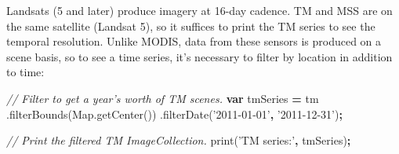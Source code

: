 \documentclass[
]{article}
\newenvironment{Shaded}{\begin{snugshade}}{\end{snugshade}}
\newcommand{\AttributeTok}[1]{\textcolor[rgb]{0.77,0.63,0.00}{#1}}
\newcommand{\CommentTok}[1]{\textcolor[rgb]{0.56,0.35,0.01}{\textit{#1}}}
\newcommand{\KeywordTok}[1]{\textcolor[rgb]{0.13,0.29,0.53}{\textbf{#1}}}
\newcommand{\NormalTok}[1]{#1}
\newcommand{\OperatorTok}[1]{\textcolor[rgb]{0.81,0.36,0.00}{\textbf{#1}}}
\newcommand{\StringTok}[1]{\textcolor[rgb]{0.31,0.60,0.02}{#1}}
\newcommand{\VariableTok}[1]{\textcolor[rgb]{0.00,0.00,0.00}{#1}}
\begin{document}
Landsats (5 and later) produce imagery at 16-day cadence. TM and MSS are on the same satellite (Landsat 5), so it suffices to print the TM series to see the temporal resolution. Unlike MODIS, data from these sensors is produced on a scene basis, so to see a time series, it's necessary to filter by location in addition to time:

\begin{Shaded}
\begin{Highlighting}[]

   \CommentTok{// Filter to get a year's worth of TM scenes.}
  \KeywordTok{var}\NormalTok{ tmSeries }\OperatorTok{=}\NormalTok{ tm}
\NormalTok{  .}\AttributeTok{filterBounds}\NormalTok{(}\VariableTok{Map}\NormalTok{.}\AttributeTok{getCenter}\NormalTok{())}
\NormalTok{  .}\AttributeTok{filterDate}\NormalTok{(}\StringTok{'2011-01-01'}\OperatorTok{,} \StringTok{'2011-12-31'}\NormalTok{)}\OperatorTok{;}
  
  \CommentTok{// Print the filtered TM ImageCollection. }
  \AttributeTok{print}\NormalTok{(}\StringTok{'TM series:'}\OperatorTok{,}\NormalTok{ tmSeries)}\OperatorTok{;}
  
\end{Highlighting}
\end{Shaded}
\end{document}
